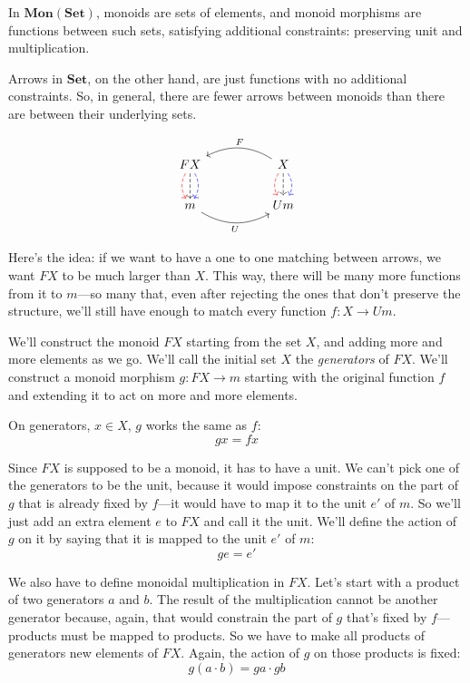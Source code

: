 \documentclass[DaoFP]{subfiles}
\begin{document}
In  $\mathbf{Mon}(\mathbf{Set})$, monoids are sets of elements, and monoid morphisms are functions between such sets, satisfying additional constraints: preserving unit and multiplication. 

Arrows in $\mathbf{Set}$, on the other hand, are just functions with no additional constraints. So, in general, there are fewer arrows between monoids than there are between their underlying sets. 

\[
 \begin{tikzcd}
F X
\arrow[d, bend right, red, dashed]
\arrow[d, dashed]
\arrow[d, bend left, blue, dashed]
  &&
X
\arrow[d, bend right, red, dashed]
\arrow[d, dashed]
\arrow[d, bend left, blue, dashed]
 \arrow[ll, bend right, "F"']
 \\
m
   \arrow[rr, bend right, "U"']
 &&
 U m
  \end{tikzcd}
\]

Here's the idea: if we want to have a one to one matching between arrows, we want $F X$ to be much larger than $X$. This way, there will be many more functions from it to $m$---so many that, even after rejecting the ones that don't preserve the structure, we'll still have enough to match every function $f \colon X \to U m$.

We'll construct the monoid $F X$ starting from the set $X$, and adding more and more elements as we go. We'll call the initial set $X$ the \emph{generators} of $F X$. We'll construct a monoid morphism $g \colon F X \to m$ starting with the original function $f$ and extending it to act on more and more elements.

On generators, $x \in X$, $g$ works the same as $f$:
\[ g x = f x \]

Since $F X$ is supposed to be a monoid, it has to have a unit. We can't pick one of the generators to be the unit, because it would impose constraints on the part of $g$ that is already fixed by $f$---it would have to map it to the unit $e'$ of $m$. So we'll just add an extra element $e$ to $F X$ and call it the unit. We'll define the action of $g$ on it by saying that it is mapped to the unit $e'$ of $m$:
\[ g e = e' \]

We also have to define monoidal multiplication in $F X$. Let's start with a product of two generators $a$ and $b$. The result of the multiplication cannot be another generator because, again, that would constrain the part of $g$ that's fixed by $f$---products must be mapped to products. So we have to make all products of generators new elements of $F X$. Again, the action of $g$ on those products is fixed:
\[ g (a \cdot b)  = g a \cdot g b\]
\end{document}
